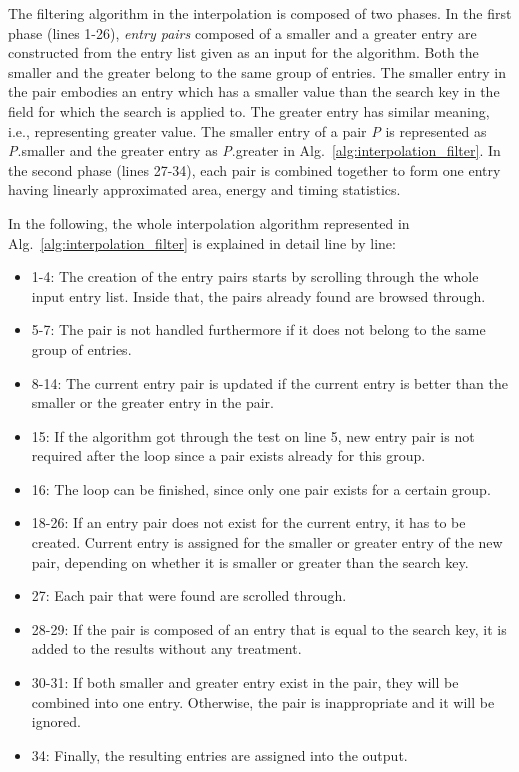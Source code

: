 \documentclass[a4paper,twoside]{tce}
\begin{document}
The filtering algorithm in the interpolation is composed of two
phases. In the first phase (lines 1-26), \emph{entry pairs} composed
of a smaller and a greater entry are constructed from the entry list
given as an input for the algorithm. Both the smaller and the greater
belong to the same group of entries. The smaller entry in the pair
embodies an entry which has a smaller value than the search key in the
field for which the search is applied to. The greater entry has
similar meaning, i.e., representing greater value. The smaller entry
of a pair \emph{P} is represented as \emph{P}.smaller and the greater
entry as \emph{P}.greater in Alg.~\ref{alg:interpolation_filter}. In
the second phase (lines 27-34), each pair is combined together to form
one entry having linearly approximated area, energy and timing
statistics.

In the following, the whole interpolation algorithm represented in
Alg.~\ref{alg:interpolation_filter} is explained in detail line
by line:
\begin{itemize}
\item 1-4: The creation of the entry pairs starts by scrolling through
      the whole input entry list. Inside that, the pairs already found
      are browsed through.
\item 5-7: The pair is not handled furthermore if it does not belong
      to the same group of entries.
\item 8-14: The current entry pair is updated if the current entry is
      better than the smaller or the greater entry in the pair.
\item 15: If the algorithm got through the test on line 5, new
      entry pair is not required after the loop since a pair exists
      already for this group.
\item 16: The loop can be finished, since only one pair exists for a
      certain group.
\item 18-26: If an entry pair does not exist for the current entry, it
      has to be created. Current entry is assigned for the smaller or
      greater entry of the new pair, depending on whether it is
      smaller or greater than the search key.
\item 27: Each pair that were found are scrolled through.
\item 28-29: If the pair is composed of an entry that is equal to the
      search key, it is added to the results without any
      treatment.
\item 30-31: If both smaller and greater entry exist in the pair, they
      will be combined into one entry. Otherwise, the pair is
      inappropriate and it will be ignored.
\item 34: Finally, the resulting entries are assigned into the output.
\end{itemize}
\end{document}
